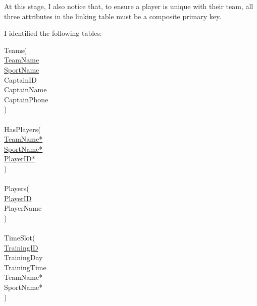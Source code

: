 \documentclass[11pt, article]{article}
\begin{document}
At this stage, I also notice that, to ensure a player is unique with their team, all three attributes in the linking table must be a composite primary key.

I identified the following tables:

\begin{tabbing}
Teams( \newline \\
	\hspace{5mm}  \underline{TeamName}\\
	\hspace{5mm} \underline{SportName} \\
	\hspace{5mm} CaptainID                      \\
	\hspace{5mm} CaptainName                 \\
	\hspace{5mm} CaptainPhone                \\
)\\
\\
HasPlayers(\\
	\hspace{5mm}  \underline{TeamName*}\\
	\hspace{5mm} \underline{SportName*} \\
	\hspace{5mm}  \underline{PlayerID*}\\
)\\
\\
	
Players( \newline \\
	\hspace{5mm}  \underline{PlayerID}\\
	\hspace{5mm} PlayerName                      \\
)\\
\\
TimeSlot( \newline \\
	\hspace{5mm}  \underline{TrainingID}\\
	\hspace{5mm} TrainingDay                     \\
	\hspace{5mm} TrainingTime \\
	\hspace{5mm}  TeamName*\\
	\hspace{5mm} SportName* \\
)\\

\end{tabbing}
\end{document}
